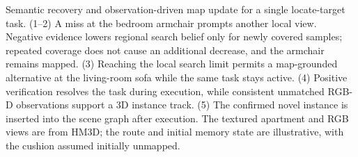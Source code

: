 \caption{Semantic recovery and observation-driven map update for a single locate-target task. (1--2) A miss at the bedroom armchair prompts another local view. Negative evidence lowers regional search belief only for newly covered samples; repeated coverage does not cause an additional decrease, and the armchair remains mapped. (3) Reaching the local search limit permits a map-grounded alternative at the living-room sofa while the same task stays active. (4) Positive verification resolves the task during execution, while consistent unmatched RGB-D observations support a 3D instance track. (5) The confirmed novel instance is inserted into the scene graph after execution. The textured apartment and RGB views are from HM3D; the route and initial memory state are illustrative, with the cushion assumed initially unmapped.}
\label{fig:semantic-recovery}
